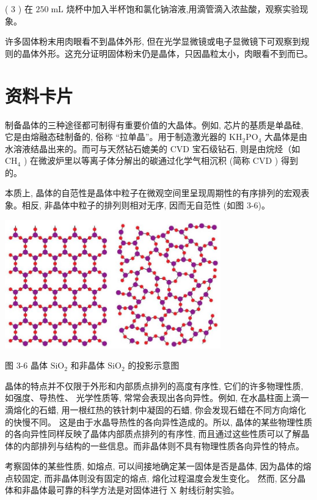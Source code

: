 \documentclass[10pt]{article}
\begin{document}
( 3 ) 在 \({250}\mathrm{\;{mL}}\) 烧杯中加入半杯饱和氯化钠溶液,用滴管滴入浓盐酸，观察实验现象。

许多固体粉末用肉眼看不到晶体外形, 但在光学显微镜或电子显微镜下可观察到规则的晶体外形。这充分证明固体粉末仍是晶体，只因晶粒太小，肉眼看不到而已。

\section*{资料卡片}

制备晶体的三种途径都可制得有重要价值的大晶体。例如, 芯片的基质是单晶硅, 它是由熔融态硅制备的, 俗称 “拉单晶”。用于制造激光器的 \({\mathrm{{KH}}}_{2}{\mathrm{{PO}}}_{4}\) 大晶体是由水溶液结晶出来的。而可与天然钻石媲美的 CVD 宝石级钻石, 则是由烷烃（如 \({\mathrm{{CH}}}_{4}\) ) 在微波炉里以等离子体分解出的碳通过化学气相沉积 (简称 CVD ) 得到的。

本质上, 晶体的自范性是晶体中粒子在微观空间里呈现周期性的有序排列的宏观表象。相反, 非晶体中粒子的排列则相对无序, 因而无自范性 (如图 3-6)。

\begin{center}
\includegraphics[max width=0.7\textwidth]{images/0190e026-5a11-7df7-bd27-54d09026ba7a_75_225935.jpg}
\end{center}

图 3-6 晶体 \({\mathrm{{SiO}}}_{2}\) 和非晶体 \({\mathrm{{SiO}}}_{2}\) 的投影示意图

晶体的特点并不仅限于外形和内部质点排列的高度有序性, 它们的许多物理性质, 如强度、导热性、 光学性质等, 常常会表现出各向异性。例如, 在水晶柱面上滴一滴熔化的石蜡, 用一根红热的铁针刺中凝固的石蜡, 你会发现石蜡在不同方向熔化的快慢不同。 这是由于水晶导热性的各向异性造成的。所以, 晶体的某些物理性质的各向异性同样反映了晶体内部质点排列的有序性, 而且通过这些性质可以了解晶体的内部排列与结构的一些信息。而非晶体则不具有物理性质各向异性的特点。

考察固体的某些性质, 如熔点, 可以间接地确定某一固体是否是晶体, 因为晶体的熔点较固定, 而非晶体则没有固定的熔点, 熔化过程温度会发生变化。 然而, 区分晶体和非晶体最可靠的科学方法是对固体进行 \(\mathrm{X}\) 射线衍射实验。
\end{document}
